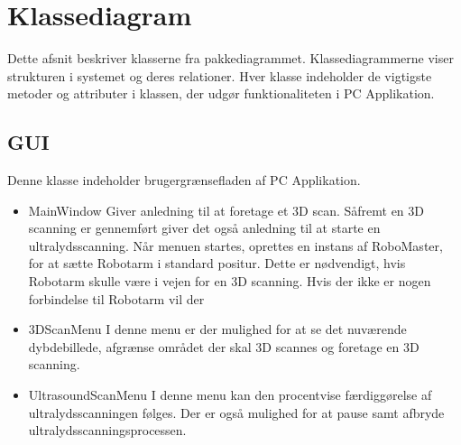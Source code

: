 \section{Klassediagram}
Dette afsnit beskriver klasserne fra pakkediagrammet. Klassediagrammerne viser strukturen i systemet og deres relationer. Hver klasse indeholder de vigtigste metoder og attributer i klassen, der udgør funktionaliteten i PC Applikation. 

\subsection{GUI}
Denne klasse indeholder brugergrænsefladen af PC Applikation.

\let\labelitemi\labelitemii
\begin{itemize}
\item{MainWindow}\newline
Giver anledning til at foretage et 3D scan. Såfremt en 3D scanning er gennemført giver det også anledning til at starte en ultralydsscanning.
Når menuen startes, oprettes en instans af RoboMaster, for at sætte Robotarm i standard positur. Dette er nødvendigt, hvis Robotarm skulle være i vejen for en 3D scanning.
Hvis der ikke er nogen forbindelse til Robotarm vil der 

\item{3DScanMenu}\newline
I denne menu er der mulighed for at se det nuværende dybdebillede, afgrænse området der skal 3D scannes og foretage en 3D scanning.

\item{UltrasoundScanMenu}\newline
I denne menu kan den procentvise færdiggørelse af ultralydsscanningen følges. Der er også mulighed for at pause samt afbryde ultralydsscanningsprocessen.
\end{itemize}

